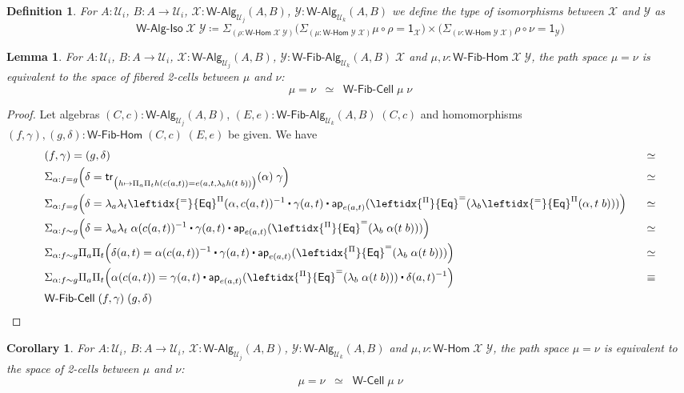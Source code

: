 \documentclass[reqno,10pt,a4paper,oneside]{amsart}
\newcommand{\X}{\mathcal{X}}
\newcommand{\Y}{\mathcal{Y}}
\newcommand{\comp}{\circ}
\newcommand{\prd}[1]{\Pi_{#1}}
\newcommand{\sm}[1]{\Sigma_{#1}}
\newcommand{\lam}[1]{\lambda_{#1}}
\newcommand{\defeq}{\coloneqq}
\newcommand{\funext}{\leftidx{^\Pi}{\mathsf{Eq}}^{=}}
\newcommand{\happly}{\leftidx{^=}{\mathsf{Eq}}^{\Pi}}
\newcommand{\one}{\mathsf{1}}
\newcommand{\UU}{\mathcal{U}}
\newcommand{\WCell}{\mathsf{W}\text{-}\mathsf{Cell}}
\newcommand{\WFibCell}{\mathsf{W}\text{-}\mathsf{Fib}\text{-}\mathsf{Cell}}
\newcommand{\WAlg}{\mathsf{W}\text{-}\mathsf{Alg}}
\newcommand{\WFibAlg}{\mathsf{W}\text{-}\mathsf{Fib}\text{-}\mathsf{Alg}}
\newcommand{\WHom}{\mathsf{W}\text{-}\mathsf{Hom}}
\newcommand{\WFibHom}{\mathsf{W}\text{-}\mathsf{Fib}\text{-}\mathsf{Hom}}
\newcommand{\app}{\mathsf{ap}}
\newcommand{\trans}{\mathsf{tr}}
\newcommand{\WAlgIso}{\mathsf{W}\text{-}\mathsf{Alg}\text{-}\mathsf{Iso}}
\newcommand{\ct}{%
  \mathchoice{\mathbin{\raisebox{0.5ex}{$\displaystyle\centerdot$}}}%
             {\mathbin{\raisebox{0.5ex}{$\centerdot$}}}%
             {\mathbin{\raisebox{0.25ex}{$\scriptstyle\,\centerdot\,$}}}%
             {\mathbin{\raisebox{0.1ex}{$\scriptscriptstyle\,\centerdot\,$}}}}
\numberwithin{equation}{section}
\theoremstyle{mythm}
\newtheorem{lemma}[theorem]{Lemma}
\newtheorem{corollary}[theorem]{Corollary}
\theoremstyle{mydef}
\newtheorem{definition}[theorem]{Definition}
\theoremstyle{myrmk}
\begin{document}
\begin{definition}
For $A:\UU_i$, $B : A \to \UU_i$, $\X : \WAlg_{\UU_j}(A,B)$, $\Y : \WAlg_{\UU_k}(A,B)$ we define the type of \emph{isomorphisms} between $\X$ and $\Y$ as
\[\WAlgIso \; \X \; \Y \defeq \sm{(\rho : \WHom \; \X \; \Y)} \Big(\sm{(\mu : \WHom \; \Y \; \X)} \mu \comp \rho = \one_\X \Big) \times \Big(\sm{(\nu : \WHom \; \Y \; \X)} \rho \comp \nu = \one_\Y \Big) \] 
\end{definition}

\begin{lemma}\label{WFibHomSpace}
For $A:\UU_i$, $B : A \to \UU_i$, $\X : \WAlg_{\UU_j}(A,B)$, $\Y : \WFibAlg_{\UU_k}(A,B) \; \X$ and $\mu,\nu : \WFibHom \; \X \; \Y$, the path space $\mu = \nu$ is equivalent to the space of fibered 2-cells between $\mu$ and $\nu$:
\[ \mu = \nu \;\; \simeq \;\; \WFibCell \; \mu \; \nu \] 
\end{lemma}
\begin{proof}
Let algebras $(C,c) : \WAlg_{\UU_j}(A,B)$, $(E,e) : \WFibAlg_{\UU_k}(A,B) \; (C,c)$ and homomorphisms $(f,\gamma), (g,\delta) : \WFibHom \; (C,c) \; (E,e)$ be given. We have
\begin{alignat*}{4}
& (f,\gamma) = (g,\delta) & \simeq \\
& \sm{\alpha : f = g} \Big(\delta = \trans_{\big(h \mapsto \prd{a}\prd{t} h(c(a,t)) = e(a,t,\lam{b} h(t\;b))\big)}(\alpha) \; \gamma\Big) & \simeq \\
& \sm{\alpha : f = g} \Big(\delta = \lam{a} \lam{t} \happly(\alpha,c(a,t))^{-1} \ct \gamma(a,t) \ct \app_{e(a,t)}(\funext (\lam{b}\happly(\alpha,t \; b))) \Big) & \;\;\; \simeq \\
& \sm{\alpha : f \sim g} \Big(\delta = \lam{a} \lam{t} \; \alpha(c(a,t))^{-1} \ct \gamma(a,t) \ct \app_{e(a,t)}(\funext (\lam{b}\; \alpha(t \; b))) \Big) & \simeq \\
& \sm{\alpha : f \sim g} \prd{a}\prd{t}\Big(\delta(a,t) = \alpha(c(a,t))^{-1} \ct \gamma(a,t) \ct \app_{e(a,t)}(\funext (\lam{b}\; \alpha(t \; b))) \Big) & \simeq \\ 
& \sm{\alpha : f \sim g} \prd{a}\prd{t}\Big(\alpha(c(a,t)) = \gamma(a,t) \ct \app_{e(a,t)}(\funext (\lam{b}\; \alpha(t \; b))) \ct \delta(a,t)^{-1} \Big) & \equiv \\ 
& \WFibCell \; (f,\gamma) \; (g,\delta)
\end{alignat*}
\end{proof}

\begin{corollary}\label{WHomSpace}
For $A:\UU_i$, $B : A \to \UU_i$, $\X : \WAlg_{\UU_j}(A,B)$, $\Y : \WAlg_{\UU_k}(A,B)$ and $\mu,\nu : \WHom \; \X \; \Y$, the path space $\mu = \nu$ is equivalent to the space of 2-cells between $\mu$ and $\nu$:
\[ \mu = \nu \;\; \simeq \;\; \WCell \; \mu \; \nu \] 
\end{corollary}
\end{document}
